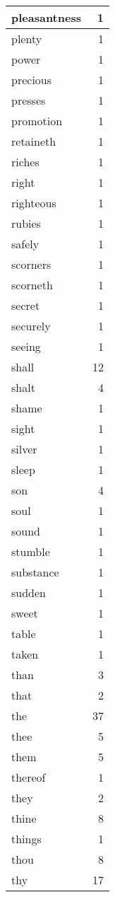 \begin{center}
\begin{longtable}{l|r}
pleasantness & 1\\ \hline 
plenty & 1\\ \hline 
power & 1\\ \hline 
precious & 1\\ \hline 
presses & 1\\ \hline 
promotion & 1\\ \hline 
retaineth & 1\\ \hline 
riches & 1\\ \hline 
right & 1\\ \hline 
righteous & 1\\ \hline 
rubies & 1\\ \hline 
safely & 1\\ \hline 
scorners & 1\\ \hline 
scorneth & 1\\ \hline 
secret & 1\\ \hline 
securely & 1\\ \hline 
seeing & 1\\ \hline 
shall & 12\\ \hline 
shalt & 4\\ \hline 
shame & 1\\ \hline 
sight & 1\\ \hline 
silver & 1\\ \hline 
sleep & 1\\ \hline 
son & 4\\ \hline 
soul & 1\\ \hline 
sound & 1\\ \hline 
stumble & 1\\ \hline 
substance & 1\\ \hline 
sudden & 1\\ \hline 
sweet & 1\\ \hline 
table & 1\\ \hline 
taken & 1\\ \hline 
than & 3\\ \hline 
that & 2\\ \hline 
the & 37\\ \hline 
thee & 5\\ \hline 
them & 5\\ \hline 
thereof & 1\\ \hline 
they & 2\\ \hline 
thine & 8\\ \hline 
things & 1\\ \hline 
thou & 8\\ \hline 
thy & 17\\ \hline 

\end{longtable}
\end{center}
